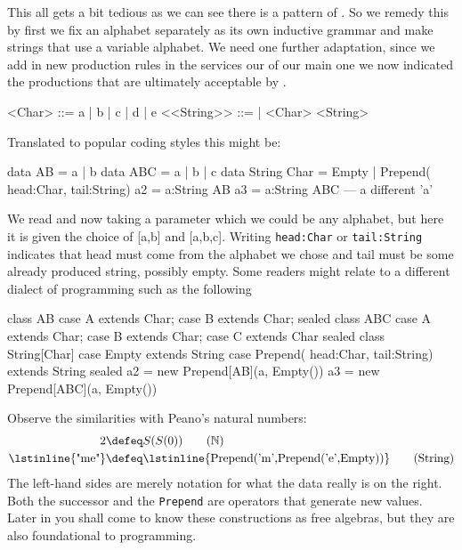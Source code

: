 This all gets a bit tedious as we can see there is a pattern of
.  So we remedy this by first we fix an alphabet
separately as its own inductive grammar and make strings that use a variable alphabet.
We need one further adaptation, since we add in new production rules in 
the services our of our main one we now indicated the productions 
that are ultimately acceptable by .
\begin{Gcode}[]
<Char> ::= a | b | c | d | e
<<String>> ::= 
           | <Char> <String>
\end{Gcode}
Translated to popular coding styles this might be:
\begin{Fcode}[]
data AB = a | b
data ABC = a | b | c 
data String Char = Empty 
            | Prepend( head:Char, tail:String) 
a2 = a:String AB
a3 = a:String ABC --- a different 'a'
\end{Fcode}
We read  and now taking a parameter 
which we could be any alphabet, but here it is given the 
choice of [a,b] and [a,b,c].
Writing \lstinline{head:Char} or \lstinline{tail:String} 
indicates that head must come from the alphabet we chose 
and tail must be some already produced string, possibly empty.
Some readers might relate to a different dialect of 
programming such as the following
\begin{Pcode}[]
class AB
  case A extends Char;  case B extends Char;
sealed
class ABC
  case A extends Char;  case B extends Char;
  case C extends Char
sealed
class String[Char]
  case Empty extends String
  case Prepend( head:Char, tail:String) extends String
sealed
a2 = new Prepend[AB](a, Empty())
a3 = new Prepend[ABC](a, Empty())
\end{Pcode}
Observe the similarities with Peano's natural numbers:
\begin{align}
     2 & \defeq S(S(0)) \tag{$\mathbb{N}$}\\
 \text{\lstinline{"me"}} & \defeq \text{\lstinline{Prepend('m',Prepend('e',Empty))}}
\tag{String}
\end{align}
The left-hand sides are merely notation for what the data really is on the right.
Both the successor and the \lstinline{Prepend} are operators that generate 
new values.  Later in you shall come to know these constructions as free algebras,
but they are also foundational to programming.



